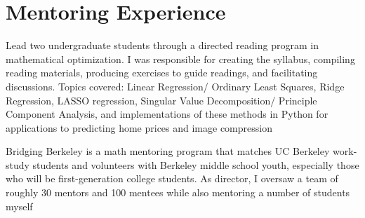 \documentclass[11pt,letter]{moderncv}
\begin{document}
\section{Mentoring Experience}
\vspace{0.05in}
\begin{itemize}
 {Lead two undergraduate students through a directed reading program in mathematical optimization.  I was responsible for creating the syllabus, compiling reading materials, producing exercises to guide readings, and facilitating discussions. Topics covered: Linear Regression/ Ordinary Least Squares, Ridge Regression, LASSO regression, Singular Value Decomposition/ Principle Component Analysis, and implementations of these methods in Python for applications to predicting home prices and 
image compression}{}{}{}{}
\end{itemize}
\vspace{0.05in}
\begin{itemize}
 {Bridging Berkeley is a math mentoring program that matches UC Berkeley work-study students and volunteers with Berkeley middle school youth, especially those who will be first-generation college students. As director, I oversaw a team of roughly 30 mentors and 100 mentees while also mentoring a number of students myself}{}{}{}{}
\end{itemize}
\vspace{0.05in}
%
%
\end{document}
